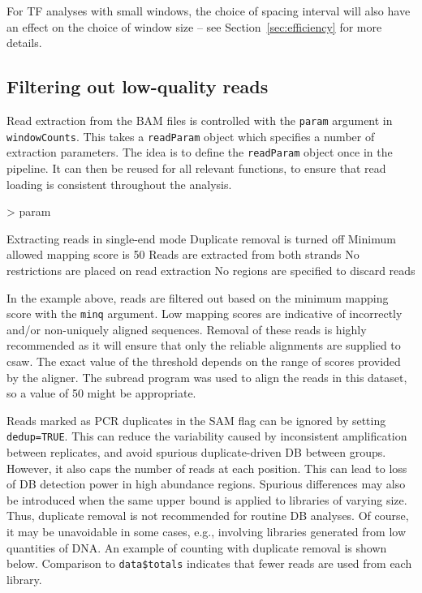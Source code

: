 \documentclass[12pt]{report}
\renewenvironment{Schunk}{\vspace{0pt}}{\vspace{0pt}}
\newcommand{\pkgname}{csaw}
\newcommand{\code}[1]{{\small\texttt{#1}}}
\newcommand{\subread}{subread}
\begin{document}
For TF analyses with small windows, the choice of spacing interval will also have an effect on the choice of window size -- see Section~\ref{sec:efficiency} for more details.

\subsection{Filtering out low-quality reads}
Read extraction from the BAM files is controlled with the \code{param} argument in \code{windowCounts}.
This takes a \code{readParam} object which specifies a number of extraction parameters.
The idea is to define the \code{readParam} object once in the pipeline.
It can then be reused for all relevant functions, to ensure that read loading is consistent throughout the analysis.

\begin{Schunk}
\begin{Sinput}
> param
\end{Sinput}
\begin{Soutput}
    Extracting reads in single-end mode
    Duplicate removal is turned off 
    Minimum allowed mapping score is 50 
    Reads are extracted from both strands
    No restrictions are placed on read extraction
    No regions are specified to discard reads
\end{Soutput}
\end{Schunk}

In the example above, reads are filtered out based on the minimum mapping score with the \code{minq} argument. 
Low mapping scores are indicative of incorrectly and/or non-uniquely aligned sequences. 
Removal of these reads is highly recommended as it will ensure that only the reliable alignments are supplied to \pkgname{}.
The exact value of the threshold depends on the range of scores provided by the aligner. 
The \subread{} program \citep{liao2013} was used to align the reads in this dataset, so a value of 50 might be appropriate.

Reads marked as PCR duplicates in the SAM flag can be ignored by setting \code{dedup=TRUE}. 
This can reduce the variability caused by inconsistent amplification between replicates, and avoid spurious duplicate-driven DB between groups. 
However, it also caps the number of reads at each position. 
This can lead to loss of DB detection power in high abundance regions. 
Spurious differences may also be introduced when the same upper bound is applied to libraries of varying size. 
Thus, duplicate removal is not recommended for routine DB analyses. 
Of course, it may be unavoidable in some cases, e.g., involving libraries generated from low quantities of DNA.
An example of counting with duplicate removal is shown below.
Comparison to \code{data\$totals} indicates that fewer reads are used from each library.
\end{document}
